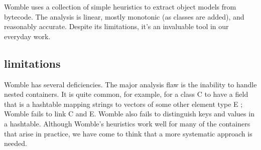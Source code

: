 \documentclass{article}
\begin{document}
 Womble uses a collection of simple heuristics to extract
object models from bytecode. The analysis is linear, mostly
monotonic (as classes are added), and reasonably accurate.
Despite its limitations,  it's an invaluable tool in our
everyday work.

\subsection{limitations}
Womble has several deficiencies. The major analysis flaw
is the inability to handle nested containers. It is quite
common, for example, for a class
C to have a field that is a
hashtable mapping strings to vectors of some other element
type E ; Womble fails to link C and E.
Womble also fails to
distinguish keys and values in a hashtable. Although
Womble's heuristics work well for many of the containers
that arise in practice, we have come to think that a more
systematic approach is needed.
\end{document}
